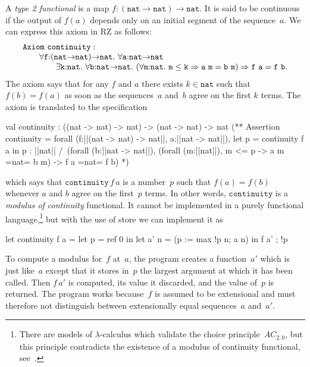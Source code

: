 A \emph{type 2 functional} is a map $f : (\mathtt{nat} \to \mathtt{nat})
\to \mathtt{nat}$. It is said to be continuous if the output of $f(a)$
depends only on an initial segment of the sequence~$a$. We can express
this axiom in RZ as follows:
%
\[
\begin{array}{l}
\iAxiom{\mathtt{continuity}}{}\\
\qquad  {\forall \mathtt{f}{:}(\mathtt{nat}{\to}\mathtt{nat}){\to}\mathtt{nat}.\   \forall \mathtt{a}{:}\mathtt{nat}{\to}{\mathtt{nat}}}\\
\qquad\qquad
    \exists \mathtt{k}{:}\mathtt{nat}.\ 
    \forall \mathtt{b}{:}\mathtt{nat}{\to}\mathtt{nat}.\
    (\forall \mathtt{m}{:}\mathtt{nat}.\ \mathtt{m} \leq \mathtt{k} \Rightarrow \mathtt{a\ m} = \mathtt{b\ m})
     \Rightarrow \mathtt{f\ a} = \mathtt{f\ b}.
\end{array}
\]
%
The axiom says that for any $f$ and $a$ there exists $k \in
\mathtt{nat}$ such that $f(b) = f(a)$ as soon as the sequences~$a$
and~$b$ agree on the first $k$ terms. The axiom is translated to the
specification
%
\begin{source}
val continuity : ((nat -> nat) -> nat) -> (nat -> nat) -> nat
(**  Assertion continuity =
forall (f:||(nat -> nat) -> nat||, a:||nat -> nat||),
  let p = continuity f a in p : ||nat|| /\
  (forall (b:||nat -> nat||),
     (forall (m:||nat||),  m <= p -> a m =nat= b m) -> f a =nat= f b)
*)
\end{source}
%
which says that $\mathtt{continuity}\,f\,a$ is a number~$p$ such that
$f(a) = f(b)$ whenever $a$ and $b$ agree on the first~$p$ terms. In
other words, $\mathtt{continuity}$ is a \emph{modulus of continuity}
functional. It cannot be implemented in a purely functional
language,\footnote{There are models of $\lambda$-calculus which validate
  the choice principle~$AC_{2,0}$, but this principle contradicts the
  existence of a modulus of continuity functional,
  see~\cite[9.6.10]{Troelstra:van-Dalen:88:2}.} but with the use of
store we can implement it as
%
\begin{source}
let continuity f a =
  let p = ref 0 in
  let a' n = (p := max !p n; a n) in
    f a' ; !p
\end{source}
%
To compute a modulus for~$f$ at~$a$, the program creates a
function~$a'$ which is just like~$a$ except that it stores in~$p$ the
largest argument at which it has been called. Then $f\,a'$ is
computed, its value it discarded, and the value of~$p$ is returned.
The program works because~$f$ is assumed to be extensional and must
therefore not distinguish between extensionally equal sequences~$a$
and~$a'$.



